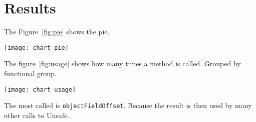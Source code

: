 
\section{Results} \label{sec:results}

The Figure~\ref{fig:pie} shows the pie.

\begin{figure*}[htb]
\centering
\vspace{-1cm}
\texttt{[image: chart-pie]}
\caption{Project using unsafe}
\label{fig:pie}
\end{figure*}

The figure~\ref{fig:usage} shows how many times a method is called. Grouped by functional group.

\begin{figure*}[htb]
\texttt{[image: chart-usage]}
\caption{sun.misc.Unsafe methods usage}
\label{fig:usage}
\end{figure*}

The most called is \texttt{objectFieldOffset}. Because the result is then used by many other calls to Unsafe.
